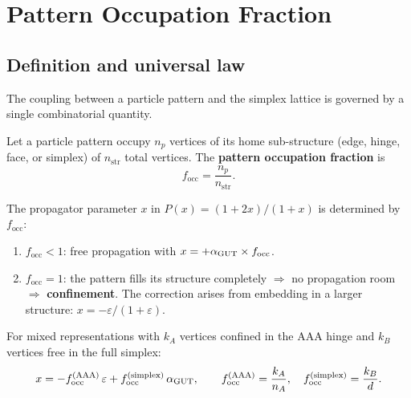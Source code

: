 
\section{Pattern Occupation Fraction}
\label{ch:occupation_fraction}

\subsection{Definition and universal law}

The coupling between a particle pattern and the simplex lattice is governed by a single combinatorial quantity.

\begin{definition}
\label{def:f_occ_main}
Let a particle pattern occupy $n_p$ vertices of its home sub-structure (edge, hinge, face, or simplex) of $n_\mathrm{str}$ total vertices.  The \textbf{pattern occupation fraction} is
\begin{equation}
\boxed{f_\mathrm{occ} = \frac{n_p}{n_\mathrm{str}}.}
\end{equation}
\end{definition}

\begin{theorem}
\label{thm:f_occ_main}
The propagator parameter $x$ in $P(x) = (1+2x)/(1+x)$ is determined by $f_\mathrm{occ}$:
\begin{enumerate}
\item $f_\mathrm{occ} < 1$: free propagation with $x = +\alpha_{\mathrm{GUT}} \times f_\mathrm{occ}$.
\item $f_\mathrm{occ} = 1$: the pattern fills its structure completely $\Rightarrow$ no propagation room $\Rightarrow$ \textbf{confinement}.  The correction arises from embedding in a larger structure: $x = -\varepsilon/(1+\varepsilon)$.
\end{enumerate}
For mixed representations with $k_A$ vertices confined in the AAA hinge and $k_B$ vertices free in the full simplex:
\begin{equation}
x = -f_\mathrm{occ}^\mathrm{(AAA)}\,\varepsilon + f_\mathrm{occ}^\mathrm{(simplex)}\,\alpha_{\mathrm{GUT}}, \qquad f_\mathrm{occ}^\mathrm{(AAA)} = \frac{k_A}{n_A}, \quad f_\mathrm{occ}^\mathrm{(simplex)} = \frac{k_B}{d}.
\end{equation}
\end{theorem}


